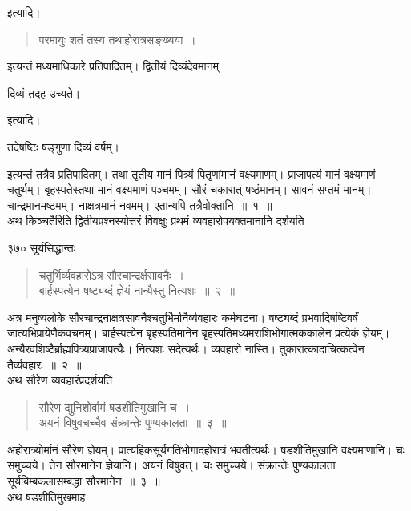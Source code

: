 \documentclass[11pt, openany]{book}
\begin{document}
\noindent इत्यादि। 


 \begin{quote}
{\qt परमायुः शतं तस्य तथाहोरात्रसङ्ख्यया~। }
\end{quote}
 इत्यन्तं मध्यमाधिकारे प्रतिपादितम्। द्वितीयं दिव्यंदेवमानम्। 

\begin{center}
  दिव्यं तदह उच्यते। 
\end{center}

\noindent इत्यादि। 

\begin{center}
 तदेषष्टिः षङ्गुणा दिव्यं वर्षम्। 
\end{center}

इत्यन्तं तत्रैव प्रतिपादितम्। तथा तृतीय मानं पित्र्यं पितृणांमानं वक्ष्यमाणम्। प्राजापत्यं मानं वक्ष्यमाणं चतुर्थम्। बृहस्पतेस्तथा मानं वक्ष्यमाणं पञ्चमम्। सौरं चकारात् षष्ठंमानम्। सावनं सप्तमं मानम्। चान्द्रमानमष्टमम्। नाक्षत्रमानं नवमम्। एतान्यपि तत्रैवोक्तानि~॥~१~॥\\
\noindent अथ किञ्चतैरिति द्वितीयप्रश्नस्योत्तरं विवक्षुः प्रथमं व्यवहारोपयक्तमानानि दर्शयति \textendash



\newpage


\noindent ३७० \hspace{4cm} सूर्यसिद्धान्तः 
\vspace{1cm}


 \begin{quote}
{\ssi चतुर्भिर्व्यवहारोऽत्र सौरचान्द्रर्क्षसावनैः~।\\
बार्हस्पत्येन षष्ट्यब्दं ज्ञेयं नान्यैस्तु नित्यशः~॥~२~॥ }
\end{quote}

 अत्र मनुष्यलोके सौरचान्द्रनाक्षत्रसावनैश्चतुर्भिर्मानैर्व्यवहारः कर्मघटना। षष्ट्यब्दं प्रभवादिषष्टिवर्षं जात्यभिप्रायेणैकवचनम्। बार्हस्पत्येन बृहस्पतिमानेन बृहस्पतिमध्यमराशिभोगात्मककालेन प्रत्येकं ज्ञेयम्। अन्यैरवशिष्टैर्ब्राह्मपित्र्यप्राजापत्यैः। नित्यशः सदेत्यर्थः। व्यवहारो नास्ति। तुकारात्कादाचित्कत्वेन तैर्व्यवहारः~॥~२~॥ \\
\noindent अथ सौरेण व्यवहारंप्रदर्शयति \textendash


\begin{quote}
{\ssi सौरेण द्युनिशोर्वामं षडशीतिमुखानि च~।\\
अयनं विषुवचच्चैव संक्रान्तेः पुण्यकालता~॥~३~॥}
\end{quote}
 अहोरात्र्योर्मानं सौरेण ज्ञेयम्। प्रात्यहिकसूर्यगतिभोगादहोरात्रं भवतीत्यर्थः। षडशीतिमुखानि वक्ष्यमाणानि। चः समुच्चये। तेन सौरमानेन ज्ञेयानि। अयनं विषुवत्। चः समुच्चये। संक्रान्तेः पुण्यकालता सूर्यबिम्बकलासम्बद्धा सौरमानेन~॥~३~॥ \\
\noindent अथ षडशीतिमुखमाह \textendash
\end{document}
